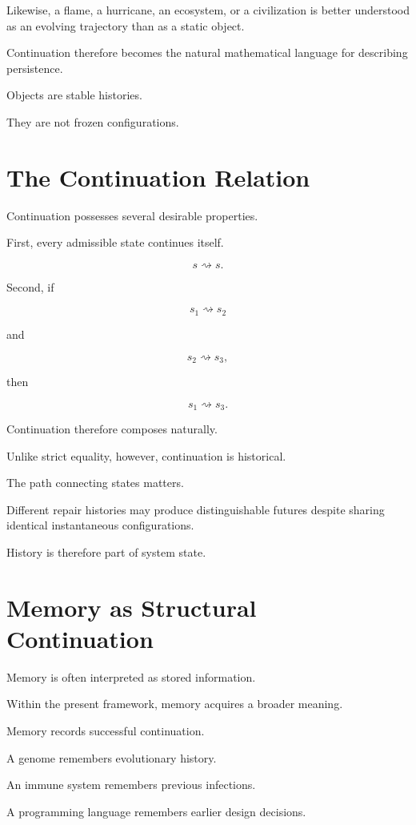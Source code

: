 \documentclass[11pt,oneside]{book}
\numberwithin{equation}{chapter}
\theoremstyle{definition}
\theoremstyle{plain}
\begin{document}
Likewise, a flame, a hurricane, an ecosystem, or a civilization is better
understood as an evolving trajectory than as a static object.

Continuation therefore becomes the natural mathematical language for
describing persistence.

Objects are stable histories.

They are not frozen configurations.

\section{The Continuation Relation}

Continuation possesses several desirable properties.

First, every admissible state continues itself.

\[
s \rightsquigarrow s.
\]

Second, if

\[
s_1 \rightsquigarrow s_2
\]

and

\[
s_2 \rightsquigarrow s_3,
\]

then

\[
s_1 \rightsquigarrow s_3.
\]

Continuation therefore composes naturally.

Unlike strict equality, however, continuation is historical.

The path connecting states matters.

Different repair histories may produce distinguishable futures despite
sharing identical instantaneous configurations.

History is therefore part of system state.

\section{Memory as Structural Continuation}

Memory is often interpreted as stored information.

Within the present framework, memory acquires a broader meaning.

Memory records successful continuation.

A genome remembers evolutionary history.

An immune system remembers previous infections.

A programming language remembers earlier design decisions.
\end{document}
